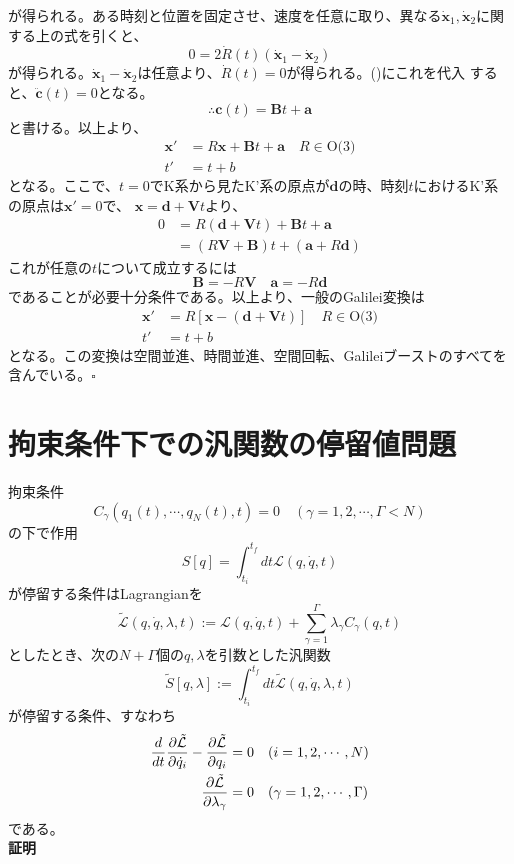 \documentclass[a4paper,11pt]{ltjsarticle}
\newcommand{\La}{\mathcal{L}}
\newcommand{\intS}{\int_{t_i}^{t_f}dt}
\begin{document}
が得られる。ある時刻と位置を固定させ、速度を任意に取り、異なる$\dot{\bm{x}}_1,\dot{\bm{x}}_2$に関する上の式を引くと、
\[
0=2\dot{R}(t)(\dot{\bm{x}}_1-\dot{\bm{x}}_2)
\]
が得られる。$\dot{\bm{x}}_1-\dot{\bm{x}}_2$は任意より、$\dot{R}(t)=0$が得られる。()にこれを代入
すると、$\ddot{\bm{c}}(t)=0$となる。
\[
\therefore \bm{c}(t)=\bm{B}t+\bm{a}
\]
と書ける。以上より、
\begin{align*}
\bm{x}'&=R\bm{x}+\bm{B}t+\bm{a} \quad R\in \text{O(3)}
\\t'&=t+b
\end{align*}
となる。ここで、$t=0$でK系から見たK'系の原点が$\bm{d}$の時、時刻$t$におけるK'系の原点は$\bm{x}'=0$で、
$\bm{x}=\bm{d}+\bm{V}t$より、
\begin{align*}
0&=R(\bm{d}+\bm{V}t)+\bm{B}t+\bm{a}
\\&=(R\bm{V}+\bm{B})t+(\bm{a}+R\bm{d})
\end{align*}
これが任意の$t$について成立するには
\[
\bm{B}=-R\bm{V} \quad \bm{a}=-R\bm{d}
\]
であることが必要十分条件である。以上より、一般のGalilei変換は
\begin{align}
\bm{x}'&=R[\bm{x}-(\bm{d}+\bm{V}t)] \quad R\in \text{O(3)}
\label{eq:Galilei General}
\\
t'&=t+b
\label{eq:Galilei General2}
\end{align}
となる。この変換は空間並進、時間並進、空間回転、Galileiブーストのすべてを含んでいる。$\square$

\section{拘束条件下での汎関数の停留値問題}
拘束条件
\begin{equation}
C_\gamma(q_1(t),\cdots,q_N(t),t)=0 \quad (\gamma=1,2,\cdots,\Gamma<N)
\label{eq:Constraint}
\end{equation}
の下で作用
\[
S[q]=\intS\La(q,\dot{q},t)
\]
が停留する条件はLagrangianを
\[
\tilde{\La}(q,\dot{q},\lambda,t):=\La(q,\dot{q},t)+\sum_{\gamma=1}^{\Gamma}\lambda_\gamma C_\gamma(q,t)
\]
としたとき、次の$N+\Gamma$個の$q,\lambda$を引数とした汎関数
\[
\tilde{S}[q,\lambda]:=\intS\tilde{\La}(q,\dot{q},\lambda,t)
\]
が停留する条件、すなわち
\begin{align}
\frac{d}{dt}\pdv{\tilde{\La}}{\dot{q}_i}-\pdv{\tilde{\La}}{q_i}&=0 \quad (i=1,2,\cdots,N)
\label{eq:ELeq2}
\\ \pdv{\tilde{\La}}{\lambda_\gamma}&=0 \quad (\gamma=1,2,\cdots,\Gamma)
\label{eq:ELeq3}
\end{align}
である。
\\\textbf{証明}
\end{document}
